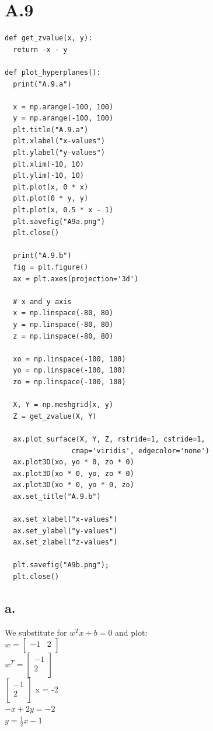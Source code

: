 \documentclass{article}
\newcommand{\1}{\mathbf{1}}
\begin{document}
\section*{A.9}
{\Large 

\begin{verbatim}
def get_zvalue(x, y):
  return -x - y

def plot_hyperplanes():
  print("A.9.a")

  x = np.arange(-100, 100)
  y = np.arange(-100, 100)
  plt.title("A.9.a")
  plt.xlabel("x-values")
  plt.ylabel("y-values")
  plt.xlim(-10, 10)
  plt.ylim(-10, 10)
  plt.plot(x, 0 * x)
  plt.plot(0 * y, y)
  plt.plot(x, 0.5 * x - 1)
  plt.savefig("A9a.png")
  plt.close()

  print("A.9.b")
  fig = plt.figure()
  ax = plt.axes(projection='3d')

  # x and y axis
  x = np.linspace(-80, 80)
  y = np.linspace(-80, 80)
  z = np.linspace(-80, 80)

  xo = np.linspace(-100, 100)
  yo = np.linspace(-100, 100)
  zo = np.linspace(-100, 100)
  
  X, Y = np.meshgrid(x, y)
  Z = get_zvalue(X, Y)
  
  ax.plot_surface(X, Y, Z, rstride=1, cstride=1,
                cmap='viridis', edgecolor='none')
  ax.plot3D(xo, yo * 0, zo * 0)
  ax.plot3D(xo * 0, yo, zo * 0)
  ax.plot3D(xo * 0, yo * 0, zo)
  ax.set_title("A.9.b")
  
  ax.set_xlabel("x-values")
  ax.set_ylabel("y-values")
  ax.set_zlabel("z-values")
  
  plt.savefig("A9b.png");
  plt.close()
\end{verbatim}

\subsection*{a.}
We substitute for $w^T x + b = 0$ and plot: \\
$w = \begin{bmatrix} -1 & 2 \\ \end{bmatrix}$ \\
$w^T = \begin{bmatrix} -1 \\ 2 \\ \end{bmatrix}$ \\
$\begin{bmatrix} -1 \\ 2 \\ \end{bmatrix}$ x = -2 \\
$-x + 2y = -2$ \\
$y = \frac{1}{2}x -1$ \\ \\ \\ \\ \\ \\ \\ \\

}
\end{document}
